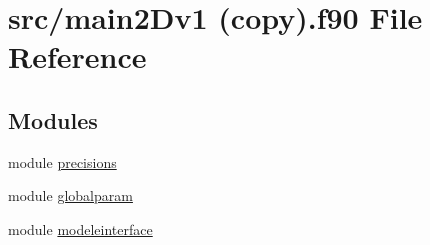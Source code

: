 \hypertarget{main2Dv1_01_07copy_08_8f90}{}\section{src/main2\+Dv1 (copy).f90 File Reference}
\label{main2Dv1_01_07copy_08_8f90}
\subsection*{Modules}
\begin{DoxyCompactItemize}
\item 
module \mbox{\hyperlink{namespaceprecisions}{precisions}}
\item 
module \mbox{\hyperlink{namespaceglobalparam}{globalparam}}
\item 
module \mbox{\hyperlink{namespacemodeleinterface}{modeleinterface}}
\end{DoxyCompactItemize}
